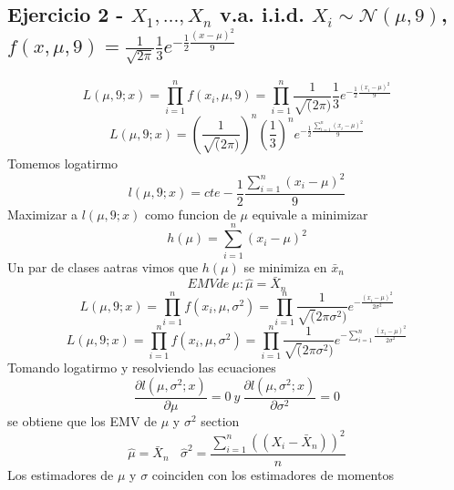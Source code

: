\documentclass[a4paper]{article}
\begin{document}
\subsection{Ejercicio 2 - $X_{1},\dots,X_{n}$ v.a. i.i.d. $X_{i} \sim \mathcal{N} (\mu, 9)$, $f(x,\mu, 9) = \frac{1}{\sqrt{2\pi}}\frac{1}{3}e^{-\frac{1}{2}\frac{(x-\mu)^2}{9}}$ }
\begin{equation*}
    L(\mu, 9; x) = \prod_{i=1}^n f(x_{i}, \mu, 9) = \prod_{i=1}^n \frac{1}{\sqrt(2\pi)}\frac{1}{3}e^{-\frac{1}{2}\frac{(x_{i}-\mu)^2}{9}}
\end{equation*}
\begin{equation*}
    L(\mu, 9; x) = (\frac{1}{\sqrt(2\pi)})^n(\frac{1}{3})^n e^{-\frac{1}{2}\frac{\sum_{i=1}^n(x_{i}-\mu)^2}{9}}
\end{equation*}
Tomemos logatirmo
\begin{equation*}
    l(\mu, 9; x) = cte - \frac{1}{2}\frac{\sum_{i=1}^n(x_{i}-\mu)^2}{9}
\end{equation*}
Maximizar a $l(\mu, 9; x)$ como funcion de $\mu$ equivale a minimizar
\begin{equation*}
    h(\mu) = \sum_{i=1}^n (x_{i} - \mu)^2
\end{equation*}
Un par de clases aatras vimos que $h(\mu)$ se minimiza en $\bar{x}_{n}$
\begin{equation*}
    EMV de \ \mu : \widehat{\mu} = \bar{X}_{n}
\end{equation*}
\begin{equation*}
    L(\mu, 9; x) = \prod_{i=1}^n f(x_{i}, \mu, \sigma^2) = \prod_{i=1}^n \frac{1}{\sqrt(2\pi\sigma^2)}e^{-\frac{(x_{i}-\mu)^2}{2\sigma^2}}
\end{equation*}
\begin{equation*}
    L(\mu, 9; x) = \prod_{i=1}^n f(x_{i}, \mu, \sigma^2) = \prod_{i=1}^n \frac{1}{\sqrt(2\pi\sigma^2)}e^{-\sum_{i=1}^n \frac{(x_{i}-\mu)^2}{2\sigma^2}}
\end{equation*}
Tomando logatirmo y resolviendo las ecuaciones
\begin{equation*}
    \frac{\partial l (\mu, \sigma^2;x)}{\partial \mu} = 0 \ y \ \frac{\partial l (\mu, \sigma^2;x)}{\partial \sigma^2} = 0
\end{equation*}
se obtiene que los EMV de $\mu$ y $\sigma^2$ section
\begin{equation*}
    \widehat{\mu} = \bar{X}_{n} \ \ \ \ \widehat{\sigma}^2 = \frac{\sum_{i=1}^n ((X_{i} - \bar{X}_n))^2}{n}
\end{equation*}
Los estimadores de $\mu$ y $\sigma$ coinciden con los estimadores de momentos
\end{document}
